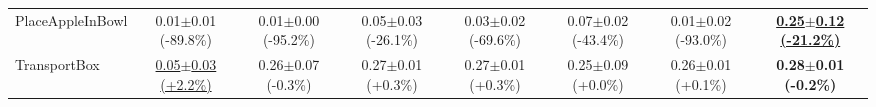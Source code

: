 \begin{table}[htbp]
\begin{adjustbox}{max width=\textwidth}
\begin{tabular}{l*{7}{c}}
PlaceAppleInBowl & 0.01$\pm$0.01 \scriptsize{(-89.8\%)} & 0.01$\pm$0.00 \scriptsize{(-95.2\%)} & 0.05$\pm$0.03 \scriptsize{(-26.1\%)} & 0.03$\pm$0.02 \scriptsize{(-69.6\%)} & 0.07$\pm$0.02 \scriptsize{(-43.4\%)} & 0.01$\pm$0.02 \scriptsize{(-93.0\%)} & \textbf{\underline{0.25$\pm$0.12 \scriptsize{(-21.2\%)}}} \\
TransportBox & \underline{0.05$\pm$0.03 \scriptsize{(+2.2\%)}} & 0.26$\pm$0.07 \scriptsize{(-0.3\%)} & 0.27$\pm$0.01 \scriptsize{(+0.3\%)} & 0.27$\pm$0.01 \scriptsize{(+0.3\%)} & 0.25$\pm$0.09 \scriptsize{(+0.0\%)} & 0.26$\pm$0.01 \scriptsize{(+0.1\%)} & \textbf{0.28$\pm$0.01 \scriptsize{(-0.2\%)}} \\
\bottomrule
\end{tabular}
\end{adjustbox}
\end{table}


